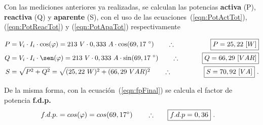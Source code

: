     Con las mediciones anteriores ya realizadas, se calculan las potencias \textbf{activa} (P), \textbf{reactiva} (Q)
    y \textbf{aparente} (S), con el uso de las ecuaciones~(\ref{eqn:PotActTot}), (\ref{eqn:PotReacTot}) y 
    (\ref{eqn:PotApaTot}) respectivamente

    \begin{align*}
      P &= V_i \cdot I_i \cdot \cos(\varphi) = 213\ V \cdot 0,333\ A \cdot \cos(69,17\ ^{\circ}) 
                                \hspace{20pt} \therefore \hspace{20pt} \Aboxed{P = 25,22\ [W]} \\
      Q &= V_i \cdot I_i \cdot \sen(\varphi) = 213\ V \cdot 0,333\ A \cdot \sin(69,17\ ^{\circ}) 
                                \hspace{20pt} \therefore \hspace{20pt} \Aboxed{Q = 66,29\ [VAR]} \\
      S &= \sqrt{P^2 + Q^2} =  \sqrt{(25,22\ W)^2 + (66,29\ VAR)^2}
                                \hspace{20pt} \therefore \hspace{20pt} \Aboxed{S = 70,92\ [VA]} \ .
    \end{align*}

    \noindent De la misma forma, con la ecuación~(\ref{eqn:fpFinal}) se calcula el factor de potencia \textbf{f.d.p.}
    \begin{align*}
      f.d.p. = cos(\varphi) = cos(69,17 ^{\circ}) \hspace{20pt} \therefore \hspace{20pt} \Aboxed{f.d.p = 0,36}\ .
    \end{align*}



